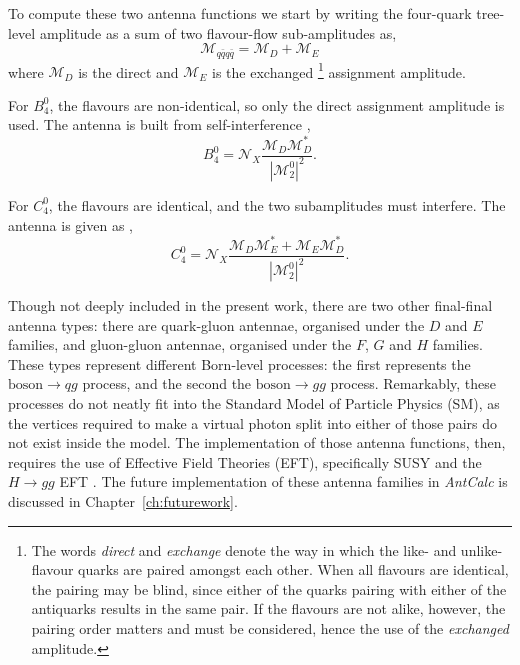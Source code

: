 To compute these two antenna functions we start by writing the four-quark tree-level 
amplitude as a sum of two flavour-flow sub-amplitudes as,
\begin{equation}
    \mathcal M_{q\bar q q\bar q}=\mathcal M_D+\mathcal M_E
\end{equation}
where $\mathcal M_D$ is the direct and 
$\mathcal M_E$ is the exchanged
\footnote{The words \textit{direct} and \textit{exchange} denote the way in which 
the like- and unlike-flavour quarks are paired amongst each other. When all flavours 
are identical, the pairing may be blind, since either of the quarks pairing with 
either of the antiquarks results in the same pair. If the flavours are not alike, 
however, the pairing order matters and must be considered, hence the use of the 
\textit{exchanged} amplitude.} 
assignment amplitude.

For $B_4^0$, the flavours are non-identical, so only the direct assignment amplitude
is used. The antenna is built from self-interference \cite{Gehrmann-DeRidder:2005btv},
\begin{equation}
    B_4^0=\mathcal N_X\frac{\mathcal M_D\mathcal M_D^*}{\left|\mathcal M_2^0\right|^2}.
\end{equation}

For $C_4^0$, the flavours are identical, and the two subamplitudes
must interfere. The antenna is given as \cite{Ellis:1996mzs,Gehrmann-DeRidder:2005btv},
\begin{equation}\label{eq:cAntTheory}
    C_4^0=\mathcal N_X\frac{\mathcal M_D\mathcal M_E^*+\mathcal M_E\mathcal M_D^*}{\left|\mathcal M_2^0\right|^2}.
\end{equation}

Though not deeply included in the present work, there are two other final-final 
antenna types:
there are quark-gluon antennae, organised under the $D$ and $E$ families,
and gluon-gluon antennae, organised under the $F$, $G$ and 
$H$ families. These types represent different Born-level 
processes: the first represents the $\text{boson}\to qg$ process, and the second the 
$\text{boson}\to gg$ process. Remarkably, these processes do not neatly fit into the 
Standard Model of Particle Physics (SM), as the vertices required to make a 
virtual photon split into either of those pairs do not exist inside the model.
The implementation of those antenna functions, then, requires the use of Effective 
Field Theories (EFT), specifically SUSY \cite{Gehrmann-DeRidder:2005btv,GehrmannDeRidder2005:neutralino} and the $H\to gg$ EFT \cite{Demartin2014,Glover2010}.
The future implementation of these antenna families in \textit{AntCalc} is discussed 
in Chapter~\ref{ch:futurework}.

